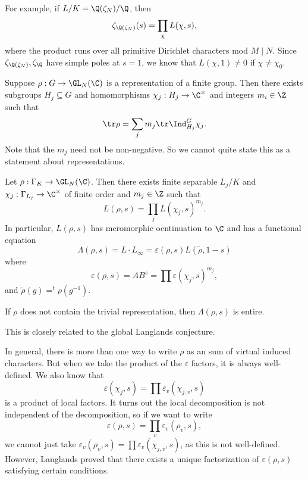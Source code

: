 \documentclass[a4paper]{article}
\begin{document}
\begin{eg}
  For example, if $L/K = \Q(\zeta_N)/\Q$, then
  \[
    \zeta_{\Q(\zeta_N)}(s) = \prod_{\chi} L(\chi, s),
  \]
  where the product runs over all primitive Dirichlet characters mod $M \mid N$. Since $\zeta_{\Q(\zeta_N)}, \zeta_\Q$ have simple poles at $s = 1$, we know that $L(\chi, 1) \not= 0$ if $\chi \not= \chi_0$.
\end{eg}

\begin{thm}
  Suppose $\rho: G \to \GL_N(\C)$ is a representation of a finite group. Then there exists subgroups $H_j \subseteq G$ and homomorphisms $\chi_j: H_j \to \C^\times$ and integers $m_i \in \Z$ such that
  \[
    \tr \rho = \sum_j m_j \tr \Ind_{H_j}^G \chi_j.
  \]
  Note that the $m_j$ need not be non-negative. So we cannot quite state this as a statement about representations.
\end{thm}

\begin{cor}
  Let $\rho: \Gamma_K \to \GL_N(\C)$. Then there exists finite separable $L_j/K$ and $\chi_j: \Gamma_{L_j} \to \C^\times$ of finite order and $m_j \in \Z$ such that
  \[
    L(\rho, s) = \prod_j L(\chi_j, s)^{m_j}.
  \]
  In particular, $L(\rho, s)$ has meromorphic ocntinuation to $\C$ and has a functional equation
  \[
    \Lambda(\rho, s) = L \cdot L_\infty = \varepsilon(\rho, s) L(\tilde{\rho}, 1 - s)
  \]
  where
  \[
    \varepsilon(\rho, s) = A B^s = \prod \varepsilon(\chi_j, s)^{m_j},
  \]
  and $\tilde{\rho}(g) = ^t \rho(g^{-1})$.
\end{cor}

\begin{conjecture}
  If $\rho$ does not contain the trivial representation, then $\Lambda(\rho, s)$ is entire.
\end{conjecture}
This is closely related to the global Langlands conjecture.

In general, there is more than one way to write $\rho$ as an sum of virtual induced characters. But when we take the product of the $\varepsilon$ factors, it is always well-defined. We also know that
\[
  \varepsilon(\chi_j, s) = \prod \varepsilon_v(\chi_{j, v}, s)
\]
is a product of local factors. It turns out the local decomposition is not independent of the decomposition, so if we want to write
\[
  \varepsilon(\rho, s) = \prod_v \varepsilon_v(\rho_v, s),
\]
we cannot just take $\varepsilon_v(\rho_v, s) = \prod \varepsilon_v(\chi_{j, v}, s)$, as this is not well-defined. However, Langlands proved that there exists a unique factorization of $\varepsilon(\rho, s)$ satisfying certain conditions.
\end{document}
